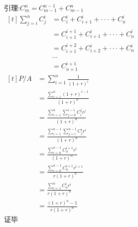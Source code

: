 \documentclass[class=ctexart,crop=false]{standalone}
\begin{document}
引理:$C_m^n=C_{m-1}^{n-1}+C_{m-1}^n$\\
$\begin{aligned}[t]
    \sum\limits_{j=i}^n C_j^i&=C_i^i+C_{i+1}^i+···+C_n^i\\
    &=C_{i+1}^{i+1}+C_{i+1}^i+···+C_n^i\\
    &=C_{i+1}^{i+2}+C_{i+2}^i+···+C_n^i\\
    & \dots\\
    &=C_{n+1}^{i+1}
\end{aligned}$\\
$\begin{aligned}[t]
    P/A&=\sum\limits_{i=1}^n \frac{1}{(1+r)^i} \\
    &=\frac{\sum\limits_{i=1}^n (1+r)^{i-1}}{(1+r)^n}  \\
    &=\frac{\sum\limits_{i=1}^n\sum\limits_{j=0}^{i-1} C_i^jr^j} {(1+r)^n}  \\
    &=\frac{\sum\limits_{i=1}^{n-1}\sum\limits_{j=i}^{n-1} C_j^ir^i} {(1+r)^n}  \\
    &=\frac{\sum\limits_{i=0}^{n-1} C_n^{i+1} r^i} {(1+r)^n}  \\
    &=\frac{\sum\limits_{i=0}^{n-1} C_n^{i+1} r^{i+1}} {r(1+r)^n}  \\
    &=\frac{\sum\limits_{i=1}^{n} C_n^{i} r^{i}} {r(1+r)^n}  \\
    &=\frac{(1+r)^{n}-1}{r(1+r)^n}
\end{aligned}$\\
证毕
\end{document}

